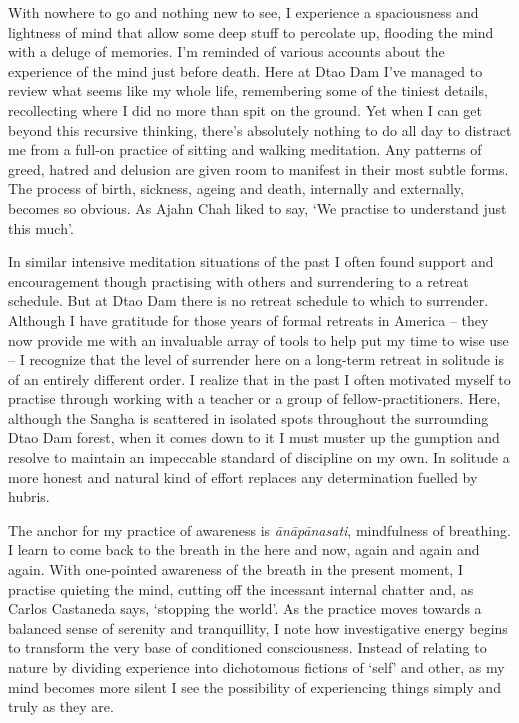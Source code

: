 With nowhere to go and nothing new to see, I experience a spaciousness
and lightness of mind that allow some deep stuff to percolate up,
flooding the mind with a deluge of memories. I'm reminded of various
accounts about the experience of the mind just before death. Here at
Dtao Dam I've managed to review what seems like my whole life,
remembering some of the tiniest details, recollecting where I did no
more than spit on the ground. Yet when I can get beyond this recursive
thinking, there's absolutely nothing to do all day to distract me from a
full-on practice of sitting and walking meditation. Any patterns of
greed, hatred and delusion are given room to manifest in their most
subtle forms. The process of birth, sickness, ageing and death,
internally and externally, becomes so obvious. As Ajahn Chah liked to
say, `We practise to understand just this much'.

In similar intensive meditation situations of the past I often found
support and encouragement though practising with others and surrendering
to a retreat schedule. But at Dtao Dam there is no retreat schedule to
which to surrender. Although I have gratitude for those years of formal
retreats in America -- they now provide me with an invaluable array of
tools to help put my time to wise use -- I recognize that the level of
surrender here on a long-term retreat in solitude is of an entirely
different order. I realize that in the past I often motivated myself to
practise through working with a teacher or a group of
fellow-practitioners. Here, although the Sangha is scattered in isolated
spots throughout the surrounding Dtao Dam forest, when it comes down to
it I must muster up the gumption and resolve to maintain an impeccable
standard of discipline on my own. In solitude a more honest and natural
kind of effort replaces any determination fuelled by hubris.

The anchor for my practice of awareness is \emph{ānāpānasati},
mindfulness of breathing. I learn to come back to the breath in the here
and now, again and again and again. With one-pointed awareness of the
breath in the present moment, I practise quieting the mind, cutting off
the incessant internal chatter and, as Carlos Castaneda says, `stopping
the world'. As the practice moves towards a balanced sense of serenity
and tranquillity, I note how investigative energy begins to transform
the very base of conditioned consciousness. Instead of relating to
nature by dividing experience into dichotomous fictions of `self' and
other, as my mind becomes more silent I see the possibility of
experiencing things simply and truly as they are.


